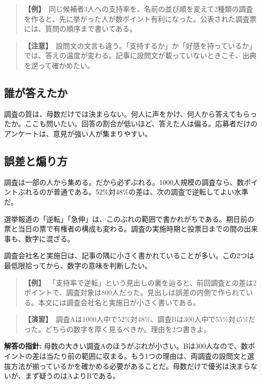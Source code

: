 \documentclass{article}
\begin{document}
\begin{quote}
\textbf{【例】}\ 同じ候補者3人への支持率を、名前の並び順を変えて2種類の調査を作ると、先に挙がった人が数ポイント有利になった。公表された調査票には、質問の順序まで書いてある。
\end{quote}

\begin{quote}
\textbf{【注意】}\ 設問文の文言も違う。「支持するか」か「好感を持っているか」では、答えの温度が変わる。記事に設問文が載っていないときこそ、出典を遻って確かめたい。
\end{quote}

\subsection{誰が答えたか}

調査の質は、母数だけでは決まらない。何人に声をかけ、何人から答えてもらったか。ここも問いたい。回答の割合が低いほど、答えた人は偏る。応募者だけのアンケートは、意見が強い人が集まりやすい。

\subsection{誤差と煽り方}

調査は一部の人から集める。だから必ずぶれる。1000人規模の調査なら、数ポイントぶれるのが普通である。52\%対48\%の差は、次の調査で逆転してよい水準だ。

選挙報道の「逆転」「急伸」は、このぶれの範囲で書かれがちである。期日前の票と当日の票で有権者の構成も変わる。調査の実施時期と投票日までの間の出来事も、数字に混ざる。

調査会社名と実施日は、記事の隅に小さく書かれていることが多い。この2つは最低限拾ってから、数字の意味を判断したい。

\begin{quote}
\textbf{【例】}\ 「支持率で逆転」という見出しの裏を辿ると、前回調査との差は2ポイントで、調査対象は800人だった。見出しは誤差の内側で作られている。本文には調査会社名と実施日が小さく書いてある。
\end{quote}

\begin{quote}
\textbf{【演習】}\ 調査Aは1000人中で52\%対48\%、調査Bは300人中で55\%対45\%だった。どちらの数字を厚く見るべきか。理由を2つ書きよ。
\end{quote}

\textbf{解答の指針:} 母数の大きい調査Aのほうがぶれが小さい。Bは300人なので、数ポイントの差は当たり前の範囲に収まる。もう1つの理由は、両調査の設問文と選抜方法が揃っているかを確かめる必要があることだ。母数だけで優劣は決まらないが、まず疑うのはAよりBである。
\end{document}
